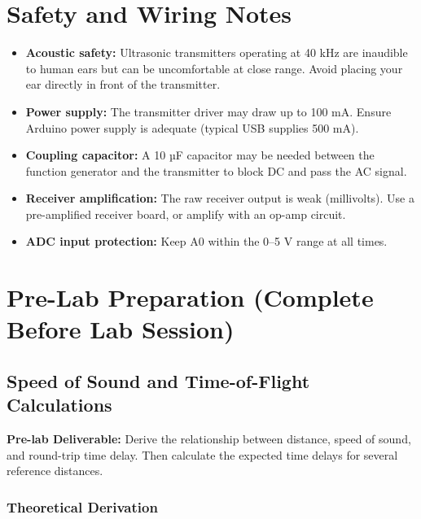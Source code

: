 \documentclass[11pt,letterpaper]{article}
\providecommand{\pldECE}[1]{\textcolor{BrickRed}{\textbf{Pre-lab Deliverable:} #1}}
\begin{document}
\section{Safety and Wiring Notes}

\begin{itemize}
    \item \textbf{Acoustic safety:} Ultrasonic transmitters operating at 40 kHz are inaudible to human ears but can be uncomfortable at close range. Avoid placing your ear directly in front of the transmitter.
    \item \textbf{Power supply:} The transmitter driver may draw up to 100 mA. Ensure Arduino power supply is adequate (typical USB supplies 500 mA).
    \item \textbf{Coupling capacitor:} A 10 µF capacitor may be needed between the function generator and the transmitter to block DC and pass the AC signal.
    \item \textbf{Receiver amplification:} The raw receiver output is weak (millivolts). Use a pre-amplified receiver board, or amplify with an op-amp circuit.
    \item \textbf{ADC input protection:} Keep A0 within the 0--5 V range at all times.
\end{itemize}

\clearpage

\section{Pre-Lab Preparation (Complete Before Lab Session)}

\subsection{Speed of Sound and Time-of-Flight Calculations}

\pldECE{Derive the relationship between distance, speed of sound, and round-trip time delay. Then calculate the expected time delays for several reference distances.}

\subsubsection*{Theoretical Derivation}
\end{document}
